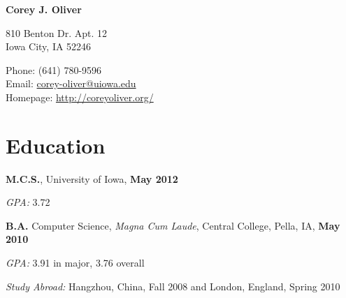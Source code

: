 \documentclass[10pt,letterpaper]{article}
\def\name{Corey J. Oliver}
\renewenvironment{itemize}{
  \begin{list}{}{
      \setlength{\leftmargin}{1.5em}
      \setlength{\itemsep}{0.25em}
      \setlength{\parskip}{0pt}
      \setlength{\parsep}{0.25em}
    }
  }{
  \end{list}
}
\begin{document}

\centerline{\huge \bf \name}

\bigskip

\begin{minipage}[t]{0.5\textwidth}
  810 Benton Dr. Apt. 12 \\
  Iowa City, IA 52246
\end{minipage}
\begin{minipage}[t]{0.5\textwidth}
  Phone: (641) 780-9596 \\
  Email: \href{mailto:corey-oliver@uiowa.edu}{corey-oliver@uiowa.edu} \\
  Homepage: \href{http://coreyoliver.org/}{http://coreyoliver.org/}
\end{minipage}

\section*{Education}

\begin{itemize}
\item \textbf{M.C.S.}, University of Iowa, \hfill \textbf{May 2012}
  \begin{itemize}
  \item \textit{GPA:}
    3.72
  \end{itemize}
\item \textbf{B.A.} Computer Science, \textit{Magna Cum Laude}, Central
  College, Pella, IA, \hfill \textbf{May 2010}
  \begin{itemize}
  \item \textit{GPA:}
    3.91 in major, 3.76 overall
  \item \textit{Study Abroad:} Hangzhou, China, Fall 2008 and
    London, England, Spring 2010
  \end{itemize}
\end{itemize}
\end{document}

